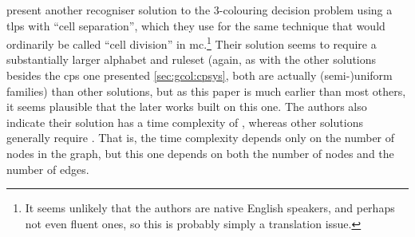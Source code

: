 \citeauthor{Wang2009} \cite{Wang2009} present another recogniser solution to the 3-colouring decision problem using a \gls{tlps} with \enquote{cell separation}, which they use for the same technique that would ordinarily be called ``cell division'' in \gls{mc}.\footnote{It seems unlikely that the authors are native English speakers, and perhaps not even fluent ones, so this is probably simply a translation issue.}  Their solution seems to require a substantially larger alphabet and \gls{ruleset} (again, as with the other solutions besides the \gls{cps} one presented \cref{sec:gcol:cpsys}, both are actually (semi-)uniform families) than other solutions, but as this paper is much earlier than most others, it seems plausible that the later works built on this one.  The authors also indicate their solution has a time complexity of , whereas other solutions generally require .  That is, the time complexity depends only on the number of nodes in the graph, but this one depends on both the number of nodes and the number of edges.


